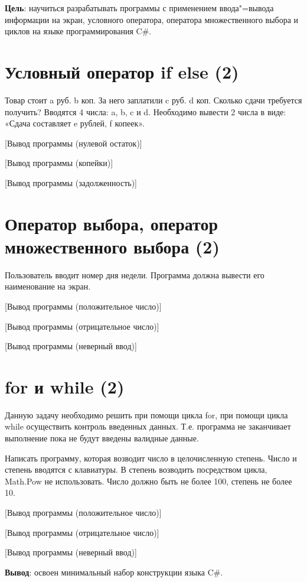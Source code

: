 \documentclass{bsuir}
\newcommand{\csharp}{C{\liberationrm\#}}
\begin{document}
\maketitle
\mainmatter
\renewcommand{\thefigure}{\arabic{figure}}
\renewcommand{\thelisting}{\arabic{listing}}

\textbf{Цель}: научиться разрабатывать программы с применением ввода"=вывода
информации на экран, условного оператора, оператора множественного выбора и
циклов на языке программирования \csharp.

\section*{Условный оператор if else (2)}

Товар стоит a руб. b коп. За него заплатили c руб. d коп. Сколько сдачи
требуется получить? Вводятся 4 числа: a, b, c и d. Необходимо вывести 2 числа в
виде: «Сдача составляет e рублей, f копеек».


[Вывод программы (нулевой остаток)]

[Вывод программы (копейки)]

[Вывод программы (задолженность)]

\section*{Оператор выбора, оператор множественного выбора (2)}

Пользователь вводит номер дня недели. Программа должна вывести его наименование
на экран.


[Вывод программы (положительное число)]

[Вывод программы (отрицательное число)]

[Вывод программы (неверный ввод)]

\section*{for и while (2)}

Данную задачу необходимо решить при помощи цикла for, при помощи цикла while
осуществить контроль введенных данных. Т.е. программа не заканчивает выполнение
пока не будут введены валидные данные.

Написать программу, которая возводит число в целочисленную степень. Число и
степень вводятся с клавиатуры. В степень возводить посредством цикла, Math.Pow
не использовать. Число должно быть не более 100, степень не более 10.


[Вывод программы (положительное число)]

[Вывод программы (отрицательное число)]

[Вывод программы (неверный ввод)]

\textbf{Вывод}: освоен минимальный набор конструкции языка \csharp.
\end{document}
